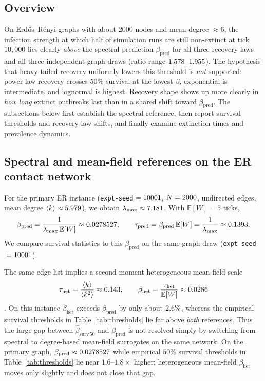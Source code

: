 \documentclass[11pt,a4paper]{article}
\begin{document}
\subsection{Overview}
On Erd\H{o}s--R\'enyi graphs with about $2000$ nodes and mean degree $\approx 6$, the infection strength at which half of simulation runs are still non-extinct at tick $10{,}000$ lies clearly \emph{above} the spectral prediction $\beta_{\mathrm{pred}}$ for all three recovery laws and all three independent graph draws (ratio range $1.578$--$1.955$). The hypothesis that heavy-tailed recovery uniformly lowers this threshold is \emph{not} supported: power-law recovery crosses $50\%$ survival at the lowest $\beta$, exponential is intermediate, and lognormal is highest. Recovery shape shows up more clearly in \emph{how long} extinct outbreaks last than in a shared shift toward $\beta_{\mathrm{pred}}$. The subsections below first establish the spectral reference, then report survival thresholds and recovery-law shifts, and finally examine extinction times and prevalence dynamics.

\subsection{Spectral and mean-field references on the ER contact network}
For the primary ER instance (\texttt{expt-seed}${}=10001$, $N=2000$, \RepNumEdges{} undirected edges, mean degree $\langle k\rangle\approx 5.979$), we obtain $\lambda_{\max}\approx 7.181$. With $\mathbb{E}[W]=5$ ticks,
\[
  \beta_{\mathrm{pred}} = \frac{1}{\lambda_{\max}\,\mathbb{E}[W]} \approx 0.0278527, \qquad
  \tau_{\mathrm{pred}} = \beta_{\mathrm{pred}}\,\mathbb{E}[W] = \frac{1}{\lambda_{\max}} \approx 0.1393.
\]
We compare survival statistics to this $\beta_{\mathrm{pred}}$ on the same graph draw (\texttt{expt-seed}${}=10001$).

The same edge list implies a second-moment heterogeneous mean-field scale
\[
  \tau_{\mathrm{het}}=\frac{\langle k\rangle}{\langle k^2\rangle}\approx 0.143,
  \qquad
  \beta_{\mathrm{het}}=\frac{\tau_{\mathrm{het}}}{\mathbb{E}[W]}\approx 0.0286
\]
\cite{PastorSatorras2015}. On this instance $\beta_{\mathrm{het}}$ exceeds $\beta_{\mathrm{pred}}$ by only about $2.6\%$, whereas the empirical survival thresholds in Table~\ref{tab:thresholds} lie far above \emph{both} references. Thus the large gap between $\hat{\beta}_{\mathrm{surv}\,50}$ and $\beta_{\mathrm{pred}}$ is not resolved simply by switching from spectral to degree-based mean-field surrogates on the same network. On the primary graph, $\beta_{\mathrm{pred}}\approx0.0278527$ while empirical $50\%$ survival thresholds in Table~\ref{tab:thresholds} lie near $1.6$--$1.8\times$ higher; heterogeneous mean-field $\beta_{\mathrm{het}}$ moves only slightly and does not close that gap.
\end{document}
